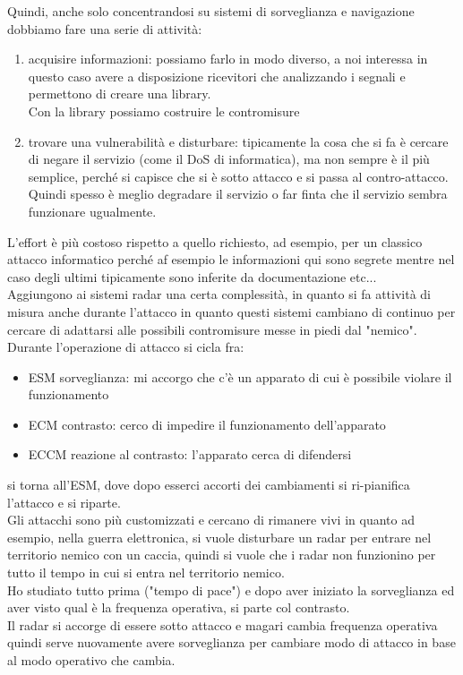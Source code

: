 \documentclass[oneside, 12pt]{extbook}
\begin{document}
Quindi, anche solo concentrandosi su sistemi di sorveglianza e navigazione dobbiamo fare una serie di attività:
\begin{enumerate}
	\item acquisire informazioni: possiamo farlo in modo diverso, a noi interessa in questo caso avere a disposizione ricevitori che analizzando i segnali e permettono di creare una library.
	\\Con la library possiamo costruire le contromisure
	\item trovare una vulnerabilità e disturbare: tipicamente la cosa che si fa è cercare di negare il servizio (come il DoS di informatica), ma non sempre è il più semplice, perché si capisce che si è sotto attacco e si passa al contro-attacco.
	\\Quindi spesso è meglio degradare il servizio o far finta che il servizio sembra funzionare ugualmente.
\end{enumerate}
L'effort è più costoso rispetto a quello richiesto, ad esempio, per un classico attacco informatico perché af esempio le informazioni qui sono segrete mentre nel caso degli ultimi tipicamente sono inferite da documentazione etc...
\\Aggiungono ai sistemi radar una certa complessità, in quanto si fa attività di misura anche durante l'attacco in quanto questi sistemi cambiano di continuo per cercare di adattarsi alle possibili contromisure messe in piedi dal "nemico".
\\Durante l'operazione di attacco si cicla fra:
\begin{itemize}
	\item ESM sorveglianza: mi accorgo che c'è un apparato di cui è possibile violare il funzionamento
	\item ECM contrasto: cerco di impedire il funzionamento dell'apparato
	\item ECCM reazione al contrasto: l'apparato cerca di difendersi
\end{itemize}
si torna all'ESM, dove dopo esserci accorti dei cambiamenti si ri-pianifica l'attacco e si riparte.
\\Gli attacchi sono più customizzati e cercano di rimanere vivi in quanto ad esempio, nella guerra elettronica, si vuole disturbare un radar per entrare nel territorio nemico con un caccia, quindi si vuole che i radar non funzionino per tutto il tempo in cui si entra nel territorio nemico.
\\Ho studiato tutto prima ("tempo di pace") e dopo aver iniziato la sorveglianza ed aver visto qual è la frequenza operativa, si parte col contrasto.
\\Il radar si accorge di essere sotto attacco e magari cambia frequenza operativa quindi serve nuovamente avere sorveglianza per cambiare modo di attacco in base al modo operativo che cambia.
\end{document}

